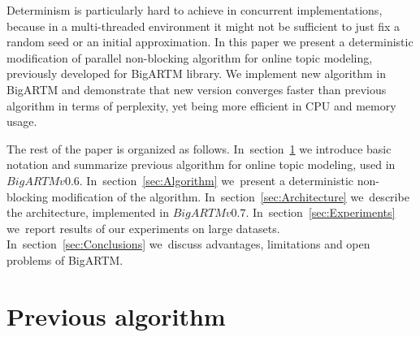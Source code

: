 \documentclass[russian,english]{llncs}
\begin{document}
Determinism is particularly hard to achieve
in concurrent implementations, because in a multi-threaded environment
it might not be sufficient to just fix a random seed or an initial approximation.
In this paper we present a deterministic modification of parallel non-blocking algorithm
for online topic modeling, previously developed for BigARTM library.
We implement new algorithm in BigARTM and demonstrate that new version converges faster
than previous algorithm in terms of perplexity,
yet being more efficient in CPU and memory usage.

The rest of the paper is organized as follows.
In~section~\ref{sec:Previous}
we introduce basic notation and summarize previous algorithm for online topic modeling, used in $BigARTM v0.6$.
In~section~\ref{sec:Algorithm}
we~present a deterministic non-blocking modification of the algorithm.
In~section~\ref{sec:Architecture}
we~describe the architecture, implemented in $BigARTM v0.7$.
In~section~\ref{sec:Experiments}
we~report results of our experiments on large datasets.
In~section~\ref{sec:Conclusions}
we~discuss advantages, limitations and open problems of BigARTM.


\section{Previous algorithm}
\label{sec:Previous}
\end{document}
